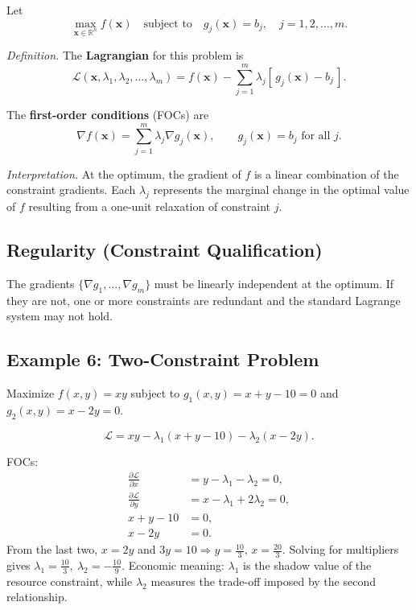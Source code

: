 \documentclass[12pt]{article}
\newcommand{\R}{\mathbb{R}}
\newcommand{\grad}{\nabla}
\newcommand{\ve}[1]{\boldsymbol{#1}}
\newcommand{\Lag}{\mathcal{L}}
\begin{document}
Let
\[
\max_{\ve{x}\in\R^n} f(\ve{x})
\quad \text{subject to} \quad
g_j(\ve{x}) = b_j, \quad j = 1,2,\dots,m.
\]

\textit{Definition.}
The \textbf{Lagrangian} for this problem is  
\[
\Lag(\ve{x},\lambda_1,\lambda_2,\dots,\lambda_m)
= f(\ve{x}) - \sum_{j=1}^m \lambda_j [\,g_j(\ve{x})-b_j\,].
\]

The \textbf{first-order conditions} (FOCs) are
\[
\grad f(\ve{x}) = \sum_{j=1}^m \lambda_j \grad g_j(\ve{x}), 
\qquad g_j(\ve{x}) = b_j \text{ for all } j.
\]

\textit{Interpretation.}  
At the optimum, the gradient of \(f\) is a linear combination of the constraint gradients. Each \(\lambda_j\) represents the marginal change in the optimal value of \(f\) resulting from a one-unit relaxation of constraint \(j\).

\subsection*{Regularity (Constraint Qualification)}

The gradients \(\{\grad g_1, \dots, \grad g_m\}\) must be linearly independent at the optimum.  
If they are not, one or more constraints are redundant and the standard Lagrange system may not hold.

\subsection*{Example 6: Two-Constraint Problem}

Maximize \( f(x,y) = x y \)  
subject to  
\( g_1(x,y)=x+y-10=0 \) and \( g_2(x,y)=x-2y=0. \)

\[
\Lag = xy - \lambda_1(x+y-10) - \lambda_2(x-2y).
\]

FOCs:
\[
\begin{aligned}
\frac{\partial \Lag}{\partial x}&=y-\lambda_1-\lambda_2=0,\\
\frac{\partial \Lag}{\partial y}&=x-\lambda_1+2\lambda_2=0,\\
x+y-10&=0,\\
x-2y&=0.
\end{aligned}
\]
From the last two, \(x=2y\) and \(3y=10\Rightarrow y=\tfrac{10}{3},\,x=\tfrac{20}{3}\).  
Solving for multipliers gives \(\lambda_1=\tfrac{10}{3},\ \lambda_2=-\tfrac{10}{9}\).  
Economic meaning: \(\lambda_1\) is the shadow value of the resource constraint, while \(\lambda_2\) measures the trade-off imposed by the second relationship.
\end{document}
